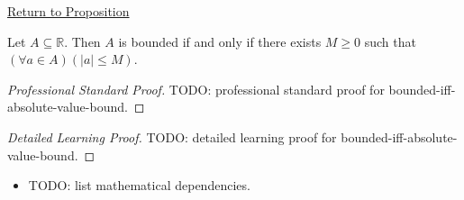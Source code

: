 \newpage
{}
\label{prf:bounded-iff-absolute-value-bound}

\begin{remark*}[Return]
\hyperref[prop:bounded-iff-absolute-value-bound]{Return to Proposition}
\end{remark*}

\begin{proposition*}
Let $A\subseteq\mathbb{R}$. Then $A$ is bounded if and only if there exists
$M\geq 0$ such that $(\forall a\in A)(|a|\leq M)$.
\end{proposition*}

\begin{proof}[Professional Standard Proof]
\LRAProofBodyStart
TODO: professional standard proof for bounded-iff-absolute-value-bound.
\end{proof}

\begin{proof}[Detailed Learning Proof]
\LRAProofBodyStart
TODO: detailed learning proof for bounded-iff-absolute-value-bound.
\end{proof}

\begin{remark*}
\end{remark*}

\begin{dependencies}
\begin{itemize}
  \item TODO: list mathematical dependencies.
\end{itemize}
\end{dependencies}

\clearpage
